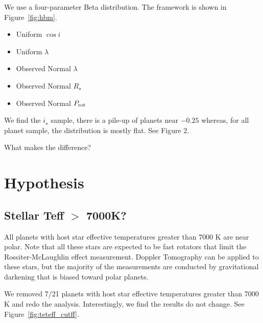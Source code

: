 \documentclass[twocolumn]{aastex631}
\begin{document}
We use a four-parameter Beta distribution. The framework is shown in Figure~\ref{fig:hbm}.

\begin{itemize}
    \item Uniform $\cos{i}$
    \item Uniform $\lambda$
    \item Observed Normal $\lambda$
    \item Observed Normal $R_\star$
    \item Observed Normal $P_{\rm rot}$
\end{itemize}

We find the $i_\star$ sample, there is a pile-up of planets near $-0.25$ whereas, for all planet sample, the distribution is mostly flat. See Figure 2.

What makes the difference?


\section{Hypothesis} \label{sec:tests}

\subsection{Stellar Teff $>$ 7000K?}
All planets with host star effective temperatures greater than 7000 K are near polar.
Note that all these stars are expected to be fast rotators that limit the Rossiter-McLaughlin effect measurement. Doppler Tomography can be applied to these stars, but the majority of the measurements are conducted by gravitational darkening that is biased toward polar planets.

We removed 7/21 planets with host star effective temperatures greater than 7000 K and redo the analysis. Interestingly, we find the results do not change. See Figure~\ref{fig:teteff_cutff}.

\end{document}
